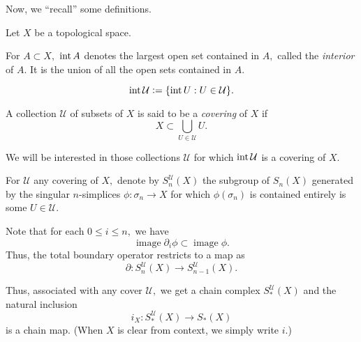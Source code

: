 \documentclass[12pt]{article}
\begin{document}
Now, we ``recall'' some definitions.

\begin{defn}
	Let $X$ be a topological space.

	For $A \subset X,$ $\operatorname{int} A$ denotes the largest open set contained in $A,$ called the \emph{interior} of $A.$ It is the union of all the open sets contained in $A.$

	\begin{equation*} 
		\operatorname{int}\mathcal{U} \vcentcolon= \{\operatorname{int} U : U \in \mathcal{U}\}.
	\end{equation*}

	A collection $\mathcal{U}$ of subsets of $X$ is said to be a \emph{covering} of $X$ if
	\begin{equation*} 
		X \subset \bigcup_{U \in \mathcal{U}}U.
	\end{equation*}
\end{defn}

We will be interested in those collections $\mathcal{U}$ for which $\operatorname{int} \mathcal{U}$ is a covering of $X.$

\begin{defn} 
	For $\mathcal{U}$ any covering of $X,$ denote by $S^{\mathcal{U}}_n(X)$ the subgroup of $S_n(X)$ generated by the singular $n$-simplices $\phi:\sigma_n \to X$ for which $\phi(\sigma_n)$ is contained entirely is some $U \in \mathcal{U}.$
\end{defn}

Note that for each $0 \le i \le n,$ we have
\begin{equation*} 
	\operatorname{image} \partial_i\phi \subset \operatorname{image} \phi.
\end{equation*}
Thus, the total boundary operator restricts to a map as
\begin{equation*} 
	\partial:S^{\mathcal{U}}_n(X) \to S^{\mathcal{U}}_{n-1}(X).
\end{equation*}

Thus, associated with any cover $\mathcal{U},$ we get a chain complex $S^{\mathcal{U}}_*(X)$ and the natural inclusion
\begin{equation*} 
	i_X:S^{\mathcal{U}}_*(X) \to S_*(X)
\end{equation*}
is a chain map. (When $X$ is clear from context, we simply write $i.$)
\end{document}

